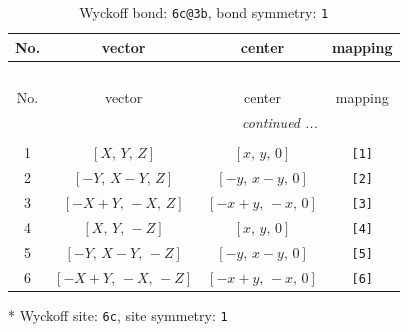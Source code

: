 \documentclass[fleqn,8pt]{jsarticle}
\begin{document}
\renewcommand{\arraystretch}{1.2}
\begin{longtable}{cccc}
\caption{Wyckoff bond: {\tt 6c@3b}, bond symmetry: {\tt 1}}
 \\
 \hline \hline
No. & vector & center & mapping \\ \hline \endfirsthead

\multicolumn{3}{l}{\tablename\ \thetable{}} \\
 \hline \hline
No. & vector & center & mapping \\ \hline \endhead

 \hline \hline
\multicolumn{3}{r}{\footnotesize\it continued ...} \\ \endfoot

 \hline \hline
\multicolumn{3}{r}{} \\ \endlastfoot

1 & $\left[ X,\, Y,\, Z \right]$ & $\left[ x,\, y,\, 0 \right]$ & {\tt [1]} \\ \hline
2 & $\left[ - Y,\, X - Y,\, Z \right]$ & $\left[ - y,\, x - y,\, 0 \right]$ & {\tt [2]} \\ \hline
3 & $\left[ - X + Y,\, - X,\, Z \right]$ & $\left[ - x + y,\, - x,\, 0 \right]$ & {\tt [3]} \\ \hline
4 & $\left[ X,\, Y,\, - Z \right]$ & $\left[ x,\, y,\, 0 \right]$ & {\tt [4]} \\ \hline
5 & $\left[ - Y,\, X - Y,\, - Z \right]$ & $\left[ - y,\, x - y,\, 0 \right]$ & {\tt [5]} \\ \hline
6 & $\left[ - X + Y,\, - X,\, - Z \right]$ & $\left[ - x + y,\, - x,\, 0 \right]$ & {\tt [6]} \\
\end{longtable}
* Wyckoff site: {\tt 6c}, site symmetry: {\tt 1}
\renewcommand{\arraystretch}{1.2}
\end{document}
